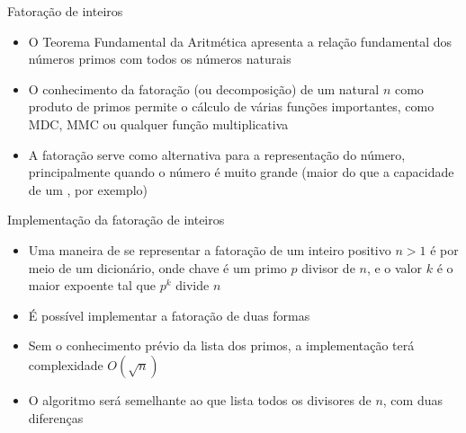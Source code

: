 \begin{frame}[fragile]{Fatoração de inteiros}

    \begin{itemize}
        \item O Teorema Fundamental da Aritmética apresenta a relação fundamental dos números
            primos com todos os números naturais

        \item O conhecimento da fatoração (ou decomposição) de um natural $n$ como produto de
            primos permite o cálculo de várias funções importantes, como MDC, MMC ou qualquer 
            função multiplicativa

        \item A fatoração serve como alternativa para a representação do número, principalmente
            quando o número é muito grande (maior do que a capacidade de um ,
            por exemplo)
    \end{itemize}

\end{frame}

\begin{frame}[fragile]{Implementação da fatoração de inteiros}

    \begin{itemize}
        \item Uma maneira de se representar a fatoração de um inteiro positivo $n > 1$ é por meio
            de um dicionário, onde chave é um primo $p$ divisor de $n$, e o valor $k$ é o maior
            expoente tal que $p^k$ divide $n$

        \item É possível implementar a fatoração de duas formas

        \item Sem o conhecimento prévio da lista dos primos, a implementação terá complexidade
            $O(\sqrt{n})$

        \item O algoritmo será semelhante ao que lista todos os divisores de $n$, com duas
            diferenças
    \end{itemize}

\end{frame}

